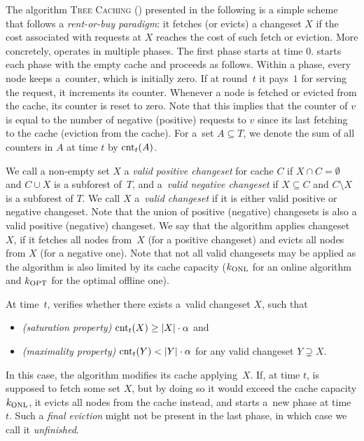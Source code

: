 The algorithm \textsc{Tree Caching} (\ALGTC) presented in the following is
a simple scheme that follows a \emph{rent-or-buy paradigm}: it fetches (or evicts)
a changeset $X$ if the cost associated with requests at $X$ reaches the cost of 
such fetch or eviction.
More concretely, \ALGTC operates in multiple phases. The first phase starts at time $0$.
\ALGTC starts each phase with the empty cache and proceeds as follows. Within a
phase, every node keeps a~counter, which is initially zero. If at round~$t$ it
pays~$1$ for serving the request, it increments its counter. Whenever a node
is fetched or evicted from the cache, its counter is reset to zero. Note that
this implies that the counter of $v$ is equal to the number of negative
(positive) requests to $v$ since its last fetching to the cache (eviction from
the cache). For a~set $A \subseteq T$, we denote the sum of all counters in
$A$ at time $t$ by $\textrm{cnt}_t(A)$.

We call a non-empty set $X$ a \emph{valid positive changeset} for cache $C$ if
$X \cap C = \emptyset$ and $C \cup X$ is a subforest of~$T$, and a~\emph{valid
negative changeset} if $X \subseteq C$ and $C \setminus X$ is a subforest of
$T$. We call $X$ a~\emph{valid changeset} if it is either valid positive or
negative changeset. Note that the union of positive (negative) changesets is
also a valid positive (negative) changeset. We say that the algorithm applies
changeset~$X$, if it fetches all nodes from~$X$ (for a positive changeset) and
evicts all nodes from $X$ (for a negative one). Note that not all valid
changesets may be applied as the algorithm is also limited by its cache capacity
($k_\textnormal{ONL}$ for an online algorithm and $k_\textnormal{OPT}$ for the optimal offline one).


At time~$t$, \ALGTC verifies whether
there exists a~valid changeset $X$, such that
\begin{itemize}
\item \emph{(saturation property)} $\textrm{cnt}_t(X) \geq |X| \cdot \alpha$ and
\item \emph{(maximality property)} $\textrm{cnt}_t(Y) < |Y| \cdot \alpha$ for any valid
  changeset $Y \supsetneq X$.
\end{itemize}
In this case, the algorithm modifies its cache applying~$X$. 
If, at time $t$, \ALGTC is supposed to fetch some set $X$, but by doing so it
would exceed the cache capacity $k_\textnormal{ONL}$, it evicts all nodes from the cache
instead, and starts a~new phase at time~$t$. Such a \emph{final eviction}
might not be present in the last phase, in which case we call it
\emph{unfinished}. 



